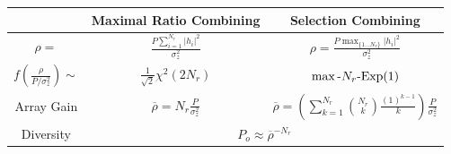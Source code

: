 \documentclass[xcolor=dvipsnames,aspectratio=169]{beamer}
\begin{document}
{\begin{columns}
\begin{column}{6cm}
 \end{column}
\end{columns}
\begin{table}
  \begin{tabular}{c|c|c}
   &Maximal Ratio Combining& Selection Combining\\\hline
   $\rho=$&$\frac{P\sum_{i=1}^{N_{r}}|h_i|^2}{\sigma_z^2}$& $\rho=\frac{ P\max_{\{1\dots N_{r}\}} |h_i|^2}{\sigma_z^2}$\\
   $f(\frac{\rho}{P/\sigma_z^2})\sim$&$\frac{1}{\sqrt{2}}\chi^2(2N_{r})$& $\max\textnormal{-}N_{r}\textnormal{-}\textnormal{Exp}(1)$\\
   Array Gain&$\overline{\rho}=N_{r}\frac{P}{\sigma_z^2}$& $\overline{\rho}=\left(\sum_{k=1}^{N_{r}}{N_{r} \choose k}\frac{(1)^{k-1}}{k}\right)\frac{P}{\sigma_z^2}$\\\hline
   Diversity& \multicolumn{2}{c}{$P_o\approx\overline{\rho}^{-N_{r}}$}
  \end{tabular}
\end{table}
}
\end{document}
